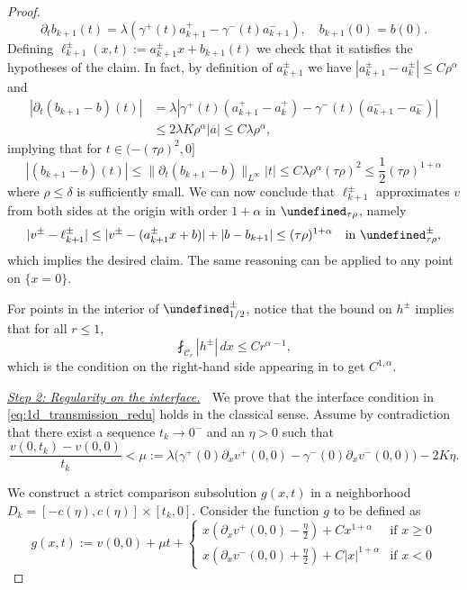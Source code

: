 \documentclass[12pt]{article}
\let\P\undefined
\numberwithin{Theorem}{section}
\theoremstyle{definition}
\theoremstyle{remark}
\numberwithin{equation}{section}
\DeclareMathOperator{\C}{\mathcal{C}}
\newcommand{\p}{\partial}
\newcommand{\P}{\mathcal{P}}
\begin{document}
\begin{proof}
\[
\p_t b_{k+1}(t)=\lambda \left( \gamma^+(t) a_{k+1}^+ - \gamma^-(t) a_{k+1}^-\right), \quad b_{k+1}(0)=b(0).
\]
Defining $\ell_{k+1}^\pm(x,t):=a_{k+1}^\pm x + b_{k+1}(t)$ we check that it satisfies the hypotheses of the claim. In fact,
by definition of $a_{k+1}^\pm$ we have $|a_{k+1}^\pm - a_k^\pm| \leq  C \rho^{ \alpha}$ and 
\begin{align*}
    |\p_t (b_{k+1}-b)(t)|&= \lambda |\gamma^+(t)(a_{k+1}^+ - a_k^+) - \gamma^-(t)(a_{k+1}^- - a_k^-)| \\
    &\leq 2 \lambda K \rho^{ \alpha} |\overline{a}| \leq C\lambda \rho^{{ \alpha}},
\end{align*}
implying that for $t \in (-(\tau\rho)^2,0]$ 
\[
|(b_{k+1}-b)(t)| \leq \|\p_t (b_{k+1}-b)\|_{L^\infty} |t| \leq C \lambda \rho^{{ \alpha}} (\tau \rho)^{2} \leq \frac{1}{2} (\tau \rho)^{1+{ \alpha}}
\] 
where $\rho \leq \delta$ is sufficiently small. 
We can now conclude that $\ell_{k+1}^\pm$ approximates $v$ from both sides at the origin with order $1+{ \alpha}$ in $\P_{\tau \rho}$, namely
\[
|v^\pm - \ell_{k+1}^\pm | \leq |v^\pm -(a_{k+1}^\pm x +b)| + |b-b_{k+1}| \leq (\tau \rho)^{1+{ \alpha}} \quad \text{in }\P_{\tau \rho}^{\pm},
\]
which implies the desired claim. The same reasoning can be applied to any point on $\{ x= 0\} $.


For points in the interior of $\P_{1/2}^\pm$, notice that the bound on $h^\pm$ implies that for all $r \leq 1$,
\[ \fint_{\C_{r}} |h^{\pm}| \, dx \leq C r^{{ \alpha}-1},
\]
which is the condition on the right-hand side appearing in \cite[Theorem 1.3]{wang1992regularityII} to get $C^{1,{ \alpha}}$.




\smallskip
\underline{ \it Step 2: Regularity on the interface.} $\;$ 
We prove that the interface condition in \eqref{eq:1d_transmission_redu}  holds in the classical sense.
Assume by contradiction that there exist a sequence $t_k \to 0^-$ and an $\eta > 0$ such that 
\begin{equation} \label{eq:case_1_d}
    \frac{v(0,t_k)-v(0,0)}{t_k} < \mu:= \lambda \big(\gamma^+(0)\partial_x v^+(0,0) - \gamma^-(0)\partial_x v^-(0,0)\big) - 2K\eta.
\end{equation}

We construct a strict comparison subsolution $g(x,t)$ in a neighborhood $D_k = [-c(\eta), c(\eta)] \times [t_k, 0]$. Consider the function $g$ to be defined as
\[
g(x,t) := v(0,0) + \mu t + 
\begin{cases}
x\left(\partial_x v^+(0,0) - \frac{\eta}{2}\right) + C x^{1+\alpha} & \text{if } x \ge 0 \\
x\left(\partial_x v^-(0,0) + \frac{\eta}{2}\right) + C |x|^{1+\alpha} & \text{if } x < 0
\end{cases}
\]


\end{proof}
\end{document}
